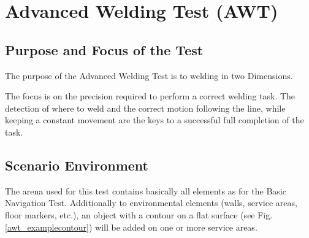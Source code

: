 \section{Advanced Welding Test (AWT)}

\subsection{Purpose and Focus of the Test}
The purpose of the Advanced Welding Test is to welding in two Dimensions. 
\par
The focus is on the precision required to perform a correct welding task. The detection of where to weld and the correct motion following the line, while keeping a constant movement are the keys to a successful full completion of the task. 

\subsection{Scenario Environment}
The arena used for this test contains basically all elements as for the Basic Navigation Test. Additionally to environmental elements (walls, service areas, floor markers, etc.), an object with a contour on a flat surface (see Fig. \ref{awt_examplecontour}) will be added on one or more service areas. 

